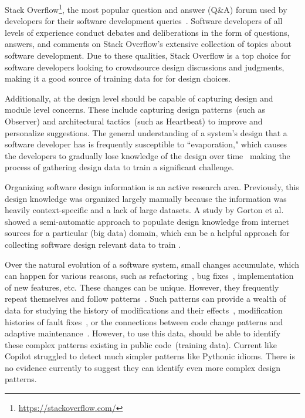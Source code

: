 Stack Overflow\footnote{\url{https://stackoverflow.com/}}, the most popular question and answer (Q\&A) forum used by developers for their software development queries~\cite{sotorrent}.
Software developers of all levels of experience conduct debates and deliberations in the form of questions, answers, and comments on Stack Overflow's extensive collection of topics about software development.
Due to these qualities, Stack Overflow is a top choice for software developers looking to crowdsource design discussions and judgments, making it a good source of training data for \cct{} for design choices.

Additionally, \cct{} at the design level should be capable of capturing design and module level concerns. 
These include capturing design patterns~(such as Observer) and architectural tactics~(such as Heartbeat) to improve and personalize suggestions.
The general understanding of a system's design that a software developer has is frequently susceptible to ``evaporation," which causes the developers to gradually lose knowledge of the design over time~\cite{martinse} making the process of gathering design data to train \cct{} a significant challenge.

Organizing software design information is an active research area. Previously, this design knowledge was organized largely manually because the information was heavily context-specific and a lack of large datasets. A study by Gorton et al.~\cite{databases} showed a semi-automatic approach to populate design knowledge from internet sources for a particular (big data) domain, which can be a helpful approach for collecting software design relevant data to train \cct{}.

Over the natural evolution of a software system, small changes accumulate, which can happen for various reasons, such as refactoring~\cite{fabio}, bug fixes~\cite{cotroneo}, implementation of new features, etc.
These changes can be unique. However, they frequently repeat themselves and follow patterns~\cite{changes}. 
Such patterns can provide a wealth of data for studying the history of modifications and their effects~\cite{martinchanges}, modification histories of fault fixes~\cite{daniel}, or the connections between code change patterns and adaptive maintenance~\cite{ijece}.
However, to use this data, \cct{} should be able to identify these complex patterns existing in public code~(training data). Current \cct{} like Copilot struggled to detect much simpler patterns like Pythonic idioms. There is no evidence currently to suggest they can identify even more complex design patterns.

